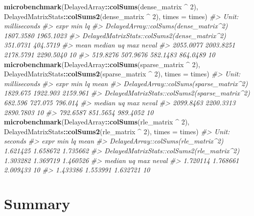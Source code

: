 \documentclass[]{book}
\newenvironment{Shaded}{\begin{snugshade}}{\end{snugshade}}
\newcommand{\KeywordTok}[1]{\textcolor[rgb]{0.13,0.29,0.53}{\textbf{#1}}}
\newcommand{\DataTypeTok}[1]{\textcolor[rgb]{0.13,0.29,0.53}{#1}}
\newcommand{\DecValTok}[1]{\textcolor[rgb]{0.00,0.00,0.81}{#1}}
\newcommand{\StringTok}[1]{\textcolor[rgb]{0.31,0.60,0.02}{#1}}
\newcommand{\CommentTok}[1]{\textcolor[rgb]{0.56,0.35,0.01}{\textit{#1}}}
\newcommand{\OperatorTok}[1]{\textcolor[rgb]{0.81,0.36,0.00}{\textbf{#1}}}
\newcommand{\NormalTok}[1]{#1}
\begin{document}
\begin{Shaded}
\begin{Highlighting}[]
\KeywordTok{microbenchmark}\NormalTok{(DelayedArray}\OperatorTok{::}\KeywordTok{colSums}\NormalTok{(dense_matrix }\OperatorTok{^}\StringTok{ }\DecValTok{2}\NormalTok{),}
\NormalTok{               DelayedMatrixStats}\OperatorTok{::}\KeywordTok{colSums2}\NormalTok{(dense_matrix }\OperatorTok{^}\StringTok{ }\DecValTok{2}\NormalTok{),}
               \DataTypeTok{times =}\NormalTok{ times)}
\CommentTok{#> Unit: milliseconds}
\CommentTok{#>                                          expr       min        lq}
\CommentTok{#>         DelayedArray::colSums(dense_matrix^2) 1807.3580 1965.1023}
\CommentTok{#>  DelayedMatrixStats::colSums2(dense_matrix^2)  351.0731  404.5719}
\CommentTok{#>       mean    median        uq       max neval}
\CommentTok{#>  2055.0077 2003.8251 2178.5791 2290.5040    10}
\CommentTok{#>   519.8276  507.9676  582.1483  864.0489    10}
\KeywordTok{microbenchmark}\NormalTok{(DelayedArray}\OperatorTok{::}\KeywordTok{colSums}\NormalTok{(sparse_matrix }\OperatorTok{^}\StringTok{ }\DecValTok{2}\NormalTok{),}
\NormalTok{               DelayedMatrixStats}\OperatorTok{::}\KeywordTok{colSums2}\NormalTok{(sparse_matrix }\OperatorTok{^}\StringTok{ }\DecValTok{2}\NormalTok{),}
               \DataTypeTok{times =}\NormalTok{ times)}
\CommentTok{#> Unit: milliseconds}
\CommentTok{#>                                           expr      min       lq     mean}
\CommentTok{#>         DelayedArray::colSums(sparse_matrix^2) 1829.675 1922.903 2159.961}
\CommentTok{#>  DelayedMatrixStats::colSums2(sparse_matrix^2)  682.596  727.075  796.014}
\CommentTok{#>     median        uq       max neval}
\CommentTok{#>  2099.8463 2200.3313 2890.7803    10}
\CommentTok{#>   792.6587  851.5654  989.4052    10}
\KeywordTok{microbenchmark}\NormalTok{(DelayedArray}\OperatorTok{::}\KeywordTok{colSums}\NormalTok{(rle_matrix }\OperatorTok{^}\StringTok{ }\DecValTok{2}\NormalTok{),}
\NormalTok{               DelayedMatrixStats}\OperatorTok{::}\KeywordTok{colSums2}\NormalTok{(rle_matrix }\OperatorTok{^}\StringTok{ }\DecValTok{2}\NormalTok{),}
               \DataTypeTok{times =}\NormalTok{ times)}
\CommentTok{#> Unit: seconds}
\CommentTok{#>                                        expr      min       lq     mean}
\CommentTok{#>         DelayedArray::colSums(rle_matrix^2) 1.621425 1.658672 1.735662}
\CommentTok{#>  DelayedMatrixStats::colSums2(rle_matrix^2) 1.303282 1.369719 1.460526}
\CommentTok{#>    median       uq      max neval}
\CommentTok{#>  1.720114 1.768661 2.009433    10}
\CommentTok{#>  1.433386 1.553991 1.632721    10}
\end{Highlighting}
\end{Shaded}

\section{Summary}\label{summary}


\end{document}
